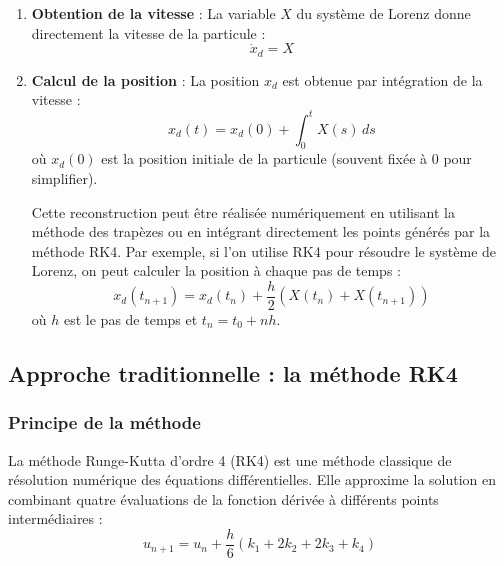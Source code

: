 \begin{enumerate}
    \item \textbf{Obtention de la vitesse} : La variable $X$ du système de Lorenz donne directement la vitesse de la particule :
    \begin{equation}
        \dot{x}_d = X
    \end{equation}
    
    \item \textbf{Calcul de la position} : La position $x_d$ est obtenue par intégration de la vitesse :
    \begin{equation}
        x_d(t) = x_d(0) + \int_0^t X(s)\,ds
    \end{equation} où $x_d(0)$ est la position initiale de la particule (souvent fixée à 0 pour simplifier).

    Cette reconstruction peut être réalisée numériquement en utilisant la méthode des trapèzes ou en intégrant directement les points générés par la méthode RK4. Par exemple, si l'on utilise RK4 pour résoudre le système de Lorenz, on peut calculer la position à chaque pas de temps :
    \begin{equation}
        x_d(t_{n+1}) = x_d(t_n) + \frac{h}{2} (X(t_n) + X(t_{n+1}))
    \end{equation}
    où \( h \) est le pas de temps et \( t_n = t_0 + n h \).
    
\end{enumerate}


\subsection{Approche traditionnelle : la méthode RK4}
\subsubsection{Principe de la méthode}
La méthode Runge-Kutta d'ordre 4 (RK4) est une méthode classique de résolution numérique des équations différentielles. Elle approxime la solution en combinant quatre évaluations de la fonction dérivée à différents points intermédiaires :
\begin{equation}
    u_{n+1} = u_n + \frac{h}{6}(k_1 + 2k_2 + 2k_3 + k_4)
    \label{eq:rk4}
    \end{equation}
    
